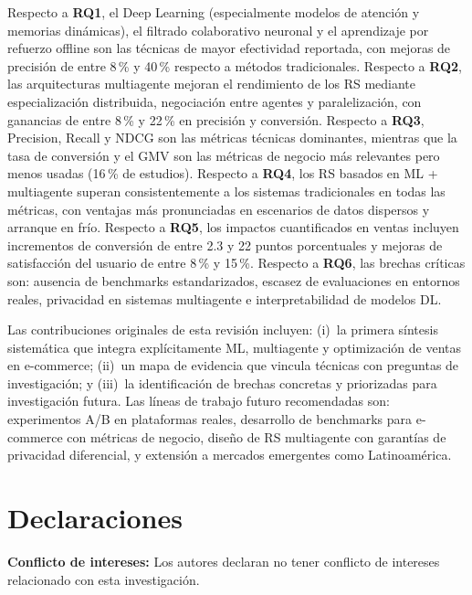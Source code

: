 \documentclass[12pt, a4paper]{article}
\begin{document}
Respecto a \textbf{RQ1}, el Deep Learning (especialmente modelos de atenci\'on
y memorias din\'amicas), el filtrado colaborativo neuronal y el aprendizaje por
refuerzo offline son las t\'ecnicas de mayor efectividad reportada, con mejoras
de precisi\'on de entre 8\,\% y 40\,\% respecto a m\'etodos tradicionales.
Respecto a \textbf{RQ2}, las arquitecturas multiagente mejoran el rendimiento
de los RS mediante especializaci\'on distribuida, negociaci\'on entre agentes y
paralelizaci\'on, con ganancias de entre 8\,\% y 22\,\% en precisi\'on y
conversi\'on. Respecto a \textbf{RQ3}, Precision, Recall y NDCG son las
m\'etricas t\'ecnicas dominantes, mientras que la tasa de conversi\'on y el GMV
son las m\'etricas de negocio m\'as relevantes pero menos usadas (16\,\% de
estudios). Respecto a \textbf{RQ4}, los RS basados en ML + multiagente superan
consistentemente a los sistemas tradicionales en todas las m\'etricas, con
ventajas m\'as pronunciadas en escenarios de datos dispersos y arranque en fr\'io.
Respecto a \textbf{RQ5}, los impactos cuantificados en ventas incluyen
incrementos de conversi\'on de entre 2.3 y 22 puntos porcentuales y mejoras de
satisfacci\'on del usuario de entre 8\,\% y 15\,\%. Respecto a \textbf{RQ6},
las brechas cr\'iticas son: ausencia de benchmarks estandarizados, escasez de
evaluaciones en entornos reales, privacidad en sistemas multiagente e
interpretabilidad de modelos DL.

Las contribuciones originales de esta revisi\'on incluyen: (i)~la primera
s\'intesis sistem\'atica que integra expl\'icitamente ML, multiagente y
optimizaci\'on de ventas en e-commerce; (ii)~un mapa de evidencia que vincula
t\'ecnicas con preguntas de investigaci\'on; y (iii)~la identificaci\'on de
brechas concretas y priorizadas para investigaci\'on futura. Las l\'ineas de
trabajo futuro recomendadas son: experimentos A/B en plataformas reales,
desarrollo de benchmarks para e-commerce con m\'etricas de negocio, dise\~no
de RS multiagente con garant\'ias de privacidad diferencial, y extensi\'on a
mercados emergentes como Latinoam\'erica.

\section*{Declaraciones}

\noindent\textbf{Conflicto de intereses:} Los autores declaran no tener
conflicto de intereses relacionado con esta investigaci\'on.
\end{document}
